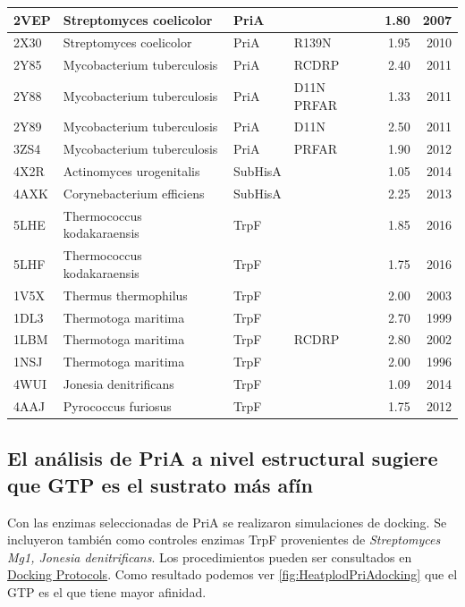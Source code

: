 \documentclass[12pt,twoside]{reedthesis}
\begin{document}
\begin{table}[t]
{\begin{tabular}{l|l|l|l|r|r}
  2VEP & Streptomyces coelicolor & PriA &  & 1.80 & 2007\\
  \hline
  2X30 & Streptomyces coelicolor & PriA & R139N & 1.95 & 2010\\
  \hline
  2Y85 & Mycobacterium tuberculosis & PriA & RCDRP & 2.40 & 2011\\
  \hline
  2Y88 & Mycobacterium tuberculosis & PriA & D11N PRFAR & 1.33 & 2011\\
  \hline
  2Y89 & Mycobacterium tuberculosis & PriA & D11N & 2.50 & 2011\\
  \hline
  3ZS4 & Mycobacterium tuberculosis & PriA & PRFAR & 1.90 & 2012\\
  \hline
  4X2R & Actinomyces urogenitalis & SubHisA &  & 1.05 & 2014\\
  \hline
  4AXK & Corynebacterium efficiens & SubHisA &  & 2.25 & 2013\\
  \hline
  5LHE & Thermococcus kodakaraensis & TrpF &  & 1.85 & 2016\\
  \hline
  5LHF & Thermococcus kodakaraensis & TrpF &  & 1.75 & 2016\\
  \hline
  1V5X & Thermus thermophilus & TrpF &  & 2.00 & 2003\\
  \hline
  1DL3 & Thermotoga maritima & TrpF &  & 2.70 & 1999\\
  \hline
  1LBM & Thermotoga maritima & TrpF & RCDRP & 2.80 & 2002\\
  \hline
  1NSJ & Thermotoga maritima & TrpF &  & 2.00 & 1996\\
  \hline
  4WUI & Jonesia denitrificans & TrpF &  & 1.09 & 2014\\
  \hline
  4AAJ & Pyrococcus furiosus & TrpF &  & 1.75 & 2012\\
  \hline
  \end{tabular}}
  \end{table}
  
  \subsection{El análisis de PriA a nivel estructural sugiere que GTP es
  el sustrato más
  afín}\label{el-analisis-de-pria-a-nivel-estructural-sugiere-que-gtp-es-el-sustrato-mas-afin}
  
  Con las enzimas seleccionadas de PriA se realizaron simulaciones de
  docking. Se incluyeron también como controles enzimas TrpF provenientes
  de \emph{Streptomyces Mg1, Jonesia denitrificans}. Los procedimientos
  pueden ser consultados en
  \href{https://github.com/tripplab/Docking/wiki}{Docking Protocols}. Como
  resultado podemos ver \autoref{fig:HeatplodPriAdocking} que el GTP es el
  que tiene mayor afinidad.
  
\end{document}
